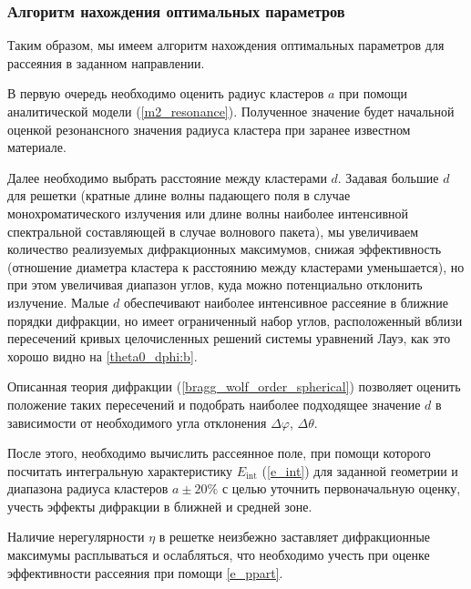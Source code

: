 \subsubsection{Алгоритм нахождения оптимальных параметров}

Таким образом, мы имеем алгоритм нахождения оптимальных параметров для рассеяния в заданном направлении. 

В первую очередь необходимо оценить радиус кластеров $a$ при помощи аналитической модели (\autoref{m2_resonance}). Полученное значение будет начальной оценкой резонансного значения радиуса кластера при заранее известном материале. 

Далее необходимо выбрать расстояние между кластерами $d$. Задавая большие $d$ для решетки (кратные длине волны падающего поля в случае монохроматического излучения или длине волны наиболее интенсивной спектральной составляющей в случае волнового пакета), мы увеличиваем количество реализуемых дифракционных максимумов, снижая эффективность (отношение диаметра кластера к расстоянию между кластерами уменьшается), но при этом увеличивая диапазон углов, куда можно потенциально отклонить излучение. Малые $d$ обеспечивают наиболее интенсивное рассеяние в ближние порядки дифракции, но имеет ограниченный набор углов, расположенный вблизи пересечений кривых целочисленных решений системы уравнений Лауэ, как это хорошо видно на \autoref{theta0_dphi:b}. 

Описанная теория дифракции (\autoref{bragg_wolf_order_spherical}) позволяет оценить положение таких пересечений и подобрать наиболее подходящее значение $d$ в зависимости от необходимого угла отклонения $\Delta \varphi$, $\Delta \theta$.

После этого, необходимо вычислить рассеянное поле, при помощи которого посчитать интегральную характеристику $E_{\textrm{int}}$ (\autoref{e_int}) для заданной геометрии и диапазона радиуса кластеров $a\pm20\%$ с целью уточнить первоначальную оценку, учесть эффекты дифракции в ближней и средней зоне.

Наличие нерегулярности $\eta$ в решетке неизбежно заставляет дифракционные максимумы расплываться и ослабляться, что необходимо учесть при оценке эффективности рассеяния при помощи \autoref{e_ppart}.